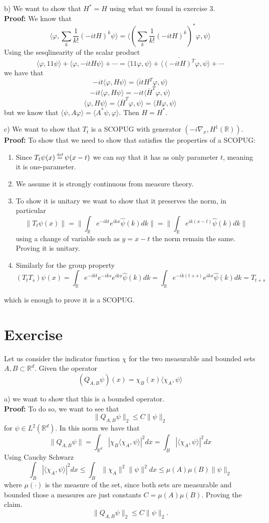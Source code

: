 \documentclass{article}
\newcommand{\R}{\mathbb{R}}
\newcommand{\1}{1\!\!1}
\newcommand{\proof}{\\ \textbf{Proof: }}
\newcommand*{\eqdef}{\ensuremath{\overset{\mathclap{\text{\tiny def}}}{=}}}
\begin{document}
b) We want to show that $H^* = H$ using what we found in exercise 3.
\proof We know that 
\[
    \langle \varphi, \sum_k \frac{1}{k!} (-itH)^k \psi \rangle = \langle \left( \sum_k \frac{1}{k!} (-itH)^k \right)^*\varphi, \psi \rangle
\]
Using the sesqlinearity of the scalar product
\[
    \langle \varphi, \1 \psi \rangle + \langle \varphi, -itH \psi \rangle + \cdots = \langle \1 \varphi, \psi \rangle + \langle \overline{(-itH)^T}\varphi, \psi \rangle + \cdots
\]
we have that 
\[
    -it\langle \varphi, H \psi \rangle =\langle \overline it H^T\varphi, \psi \rangle
\]
\[
    -it\langle \varphi, H \psi \rangle = -it\langle \overline H^T\varphi, \psi \rangle
\]
\[
    \langle \varphi, H \psi \rangle = \langle \overline H^T\varphi, \psi \rangle = \langle  H \varphi, \psi \rangle
\]
but we know that $\langle \psi, A \varphi \rangle = \langle A^* \psi, \varphi \rangle$. Then $H = H^*$.

c) We want to show that $T_t$ is a SCOPUG  with generator $(-i\nabla_x, H^1(\R))$.
\proof To show that we need to show that satisfies the properties of a SCOPUG:
\begin{enumerate} [label = \roman*)]
    \item Since $T_t \psi (x) \eqdef \psi (x-t)$ we can say that it has as only parameter $t$, meaning it is one-parameter.
    \item We assume it is strongly continuous from measure theory.
    \item To show it is unitary we want to show that it preserves the norm, in particular 
    \[
        \| T_t \psi(x)\| = \bigg\| \int_\R e^{-ikt} e^{ikx} \hat\psi(k) dk \bigg\| = \bigg\| \int_\R e^{ik(x-t)} \hat\psi(k) dk \bigg\|
    \]
    using a change of variable such as $y = x-t$ the norm remain the same. Proving it is unitary.
    \item Similarly for the group property
    \[
       (T_tT_s) \psi(x) = \int_\R e^{-ikt} e^{-iks} e^{ikx} \hat\psi(k) dk = \int_\R e^{-ik(t+s)} e^{ikx} \hat\psi(k) dk = T_{t+s}
    \]
\end{enumerate}
which is enough to prove it is a SCOPUG.
\section{Exercise}
Let us consider the indicator function $\chi$ for the two measurable and bounded sets $A, B \subset \R^d$. Given the operator
\[
    (Q_{A,B} \psi) (x) = \chi_B(x) \langle \chi_A, \psi \rangle
\]

a) we want to show that this is a bounded operator.
\proof To do so, we want to see that 
\[
    \| Q_{A,B} \psi \|_2 \leq C \| \psi\|_2
\]
for $\psi \in L^2(\R^d)$. In this norm we have that
\[
    \| Q_{A,B} \psi \| = \int_{ \R^d} | \chi_B \langle \chi_A, \psi \rangle |^2 dx = \int_B | \langle \chi_A, \psi \rangle |^2 dx
\]
Using Cauchy Schwarz
\[
    \int_B | \langle \chi_A, \psi \rangle |^2 dx \leq \int_B \| \chi_A \|^2 \| \psi \|^2 dx \leq \mu(A) \mu(B) \| \psi \|_2
\]
where $\mu(\cdot)$ is the measure of the set, since both sets are measurable and bounded those a measures are just constants $C= \mu(A) \mu(B)$. Proving the claim.
\[
    \| Q_{A,B} \psi \|_2 \leq C \| \psi\|_2.
\]
\end{document}
